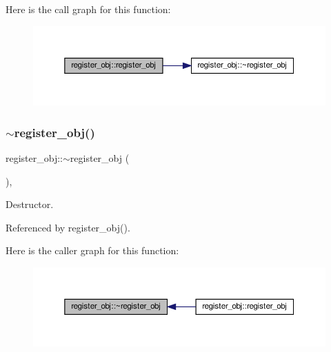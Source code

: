 Here is the call graph for this function\+:
\nopagebreak
\begin{figure}[H]
\begin{center}
\leavevmode
\includegraphics[width=350pt]{d8/d74/classregister__obj_a8e082a6770bec3bc9b8c7708f83f0700_cgraph}
\end{center}
\end{figure}
\mbox{\label{classregister__obj_a7c3a2d727859f17885168283efe414e6}} 
\subsubsection{\texorpdfstring{$\sim$register\+\_\+obj()}{~register\_obj()}}
{\footnotesize\ttfamily register\+\_\+obj\+::$\sim$register\+\_\+obj (\begin{DoxyParamCaption}{ }\end{DoxyParamCaption})\hspace{0.3cm}{\ttfamily [override]}, {\ttfamily [default]}}



Destructor. 



Referenced by register\+\_\+obj().

Here is the caller graph for this function\+:
\nopagebreak
\begin{figure}[H]
\begin{center}
\leavevmode
\includegraphics[width=350pt]{d8/d74/classregister__obj_a7c3a2d727859f17885168283efe414e6_icgraph}
\end{center}
\end{figure}


